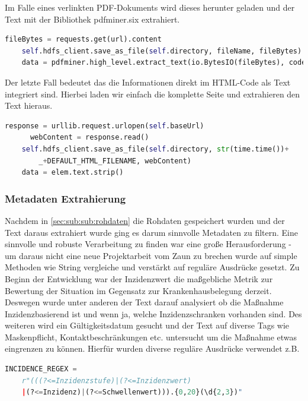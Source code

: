 \documentclass[12pt,oneside,a4paper,parskip]{scrbook}
\begin{document}
Im Falle eines verlinkten PDF-Dokuments wird dieses herunter geladen und der Text mit der Bibliothek pdfminer.six extrahiert.

\begin{lstlisting}[caption=PDF Text Extraktion, language=Python]
	fileBytes = requests.get(url).content
	self.hdfs_client.save_as_file(self.directory, fileName, fileBytes)
	data = pdfminer.high_level.extract_text(io.BytesIO(fileBytes), codec="utf-8")
\end{lstlisting}

Der letzte Fall bedeutet das die Informationen direkt im HTML-Code als Text integriert sind. Hierbei laden wir einfach die komplette Seite und extrahieren den Text hieraus.

\begin{lstlisting}[caption=Website speichern, language=Python]
	response = urllib.request.urlopen(self.baseUrl)
      webContent = response.read()
	self.hdfs_client.save_as_file(self.directory, str(time.time())+
		_+DEFAULT_HTML_FILENAME, webContent)
	data = elem.text.strip() 
\end{lstlisting}

\subsubsection{Metadaten Extrahierung}

Nachdem in \cref{sec:sub:sub:rohdaten} die Rohdaten gespeichert wurden und der Text daraus extrahiert wurde ging es darum sinnvolle Metadaten zu filtern. Eine sinnvolle und robuste Verarbeitung zu finden war eine große Herausforderung - um daraus nicht eine neue Projektarbeit vom Zaun zu brechen wurde auf simple Methoden wie String vergleiche und verstärkt auf reguläre Ausdrücke gesetzt. Zu Beginn der Entwicklung war der Inzidenzwert die maßgebliche Metrik zur Bewertung der Situation im Gegensatz zur Krankenhausbelegung derzeit. Deswegen wurde unter anderen der Text darauf analysiert ob die Maßnahme Inzidenzbasierend ist und wenn ja, welche Inzidenzschranken vorhanden sind. Des weiteren wird ein Gültigkeitsdatum gesucht und der Text auf diverse Tags wie Maskenpflicht, Kontaktbeschränkungen etc. untersucht um die Maßnahme etwas eingrenzen zu können. Hierfür wurden diverse reguläre Ausdrücke verwendet z.B. 

\begin{lstlisting}[caption=Regex für Inzidenzschranken, language=Python]
INCIDENCE_REGEX = 
	r"(((?<=Inzidenzstufe)|(?<=Inzidenzwert)
	|(?<=Inzidenz)|(?<=Schwellenwert))).{0,20}(\d{2,3})"
\end{lstlisting}
\end{document}
